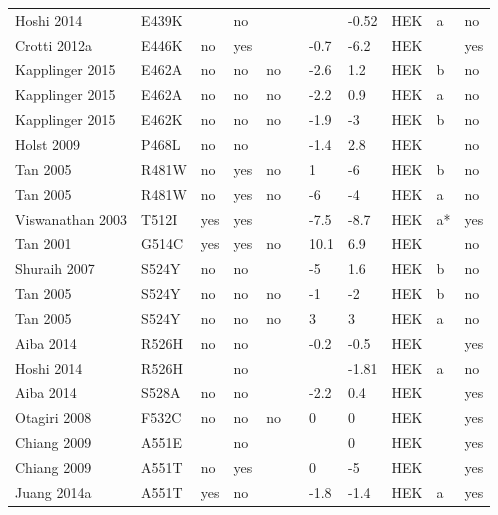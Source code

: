 \begin{tiny}
\begin{longtable}{p{4cm}|l|llll|ll|lll}
Hoshi 2014\cite{Hoshi2014MutationDB} & E439K &  & no &  &  &  & -0.52 & HEK & a & no \\
Crotti 2012a\cite{Crotti2012aMutationDB} & E446K & no & yes &  &  & -0.7 & -6.2 & HEK &  & yes \\
Kapplinger 2015\cite{Kapplinger2015MutationDB} & E462A & no & no & no &  & -2.6 & 1.2 & HEK & b & no \\
Kapplinger 2015\cite{Kapplinger2015MutationDB} & E462A & no & no & no &  & -2.2 & 0.9 & HEK & a & no \\
Kapplinger 2015\cite{Kapplinger2015MutationDB} & E462K & no & no & no &  & -1.9 & -3 & HEK & b & no \\
Holst 2009\cite{Holst2009MutationDB} & P468L & no & no &  &  & -1.4 & 2.8 & HEK &  & no \\
Tan 2005\cite{Tan2005MutationDB} & R481W & no & yes & no &  & 1 & -6 & HEK & b & no \\
Tan 2005\cite{Tan2005MutationDB} & R481W & no & yes & no &  & -6 & -4 & HEK & a & no \\
Viswanathan 2003\cite{Viswanathan2003MutationDB} & T512I & yes & yes &  &  & -7.5 & -8.7 & HEK & a* & yes \\
Tan 2001\cite{Tan2001MutationDB} & G514C & yes & yes & no &  & 10.1 & 6.9 & HEK &  & no \\
Shuraih 2007\cite{Shuraih2007MutationDB} & S524Y & no & no &  &  & -5 & 1.6 & HEK & b & no \\
Tan 2005\cite{Tan2005MutationDB} & S524Y & no & no & no &  & -1 & -2 & HEK & b & no \\
Tan 2005\cite{Tan2005MutationDB} & S524Y & no & no & no &  & 3 & 3 & HEK & a & no \\
Aiba 2014\cite{Aiba2014MutationDB} & R526H & no & no &  &  & -0.2 & -0.5 & HEK &  & yes \\
Hoshi 2014\cite{Hoshi2014MutationDB} & R526H &  & no &  &  &  & -1.81 & HEK & a & no \\
Aiba 2014\cite{Aiba2014MutationDB} & S528A & no & no &  &  & -2.2 & 0.4 & HEK &  & yes \\
Otagiri 2008\cite{Otagiri2008MutationDB} & F532C & no & no & no &  & 0 & 0 & HEK &  & yes \\
Chiang 2009\cite{Chiang2009MutationDB} & A551E &  & no &  &  &  & 0 & HEK &  & yes \\
Chiang 2009\cite{Chiang2009MutationDB} & A551T & no & yes &  &  & 0 & -5 & HEK &  & yes \\
Juang 2014a\cite{Juang2014aMutationDB} & A551T & yes & no &  &  & -1.8 & -1.4 & HEK & a & yes \\

\end{longtable}
\end{tiny}
